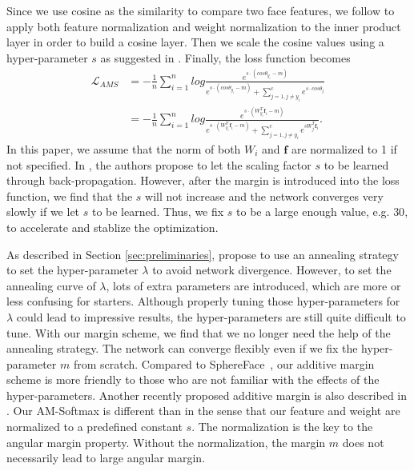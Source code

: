 \documentclass[10pt,twocolumn,letterpaper]{article}
\begin{document}
Since we use cosine as the similarity to compare two face features, we follow \cite{wang2017normface,liu2017spherenet,liu_2017_coco_v2} to apply both feature normalization and weight normalization to the inner product layer in order to build a cosine layer. Then we scale the cosine values using a hyper-parameter $s$ as suggested in \cite{wang2017normface,liu2017spherenet,liu_2017_coco_v2}. Finally, the loss function becomes
\begin{equation}
\begin{aligned}
\mathcal{L}_{AMS} & = -\frac{1}{n}\sum_{i=1}^n{log\frac{e^{s \cdot  \left(cos\theta_{y_i} - m \right)}}{e^{s \cdot \left(cos\theta_{y_i} - m \right)} + \sum_{j=1,j\neq y_i}^{c}{e^{s \cdot  cos\theta_{j}}}}}\\
& = -\frac{1}{n}\sum_{i=1}^n{log\frac{e^{s \cdot  \left(W_{y_i}^T \bm{f}_i - m \right)}}{e^{s \cdot  \left(W_{y_i}^T \bm{f}_i - m \right)} + \sum_{j=1,j\neq y_i}^c{e^{s W_j^T \bm{f}_i}}}}.
\end{aligned}
\label{eq:am-softmax}
\end{equation}
In this paper, we assume that the norm of both $W_i$ and $\bm{f}$ are normalized to 1 if not specified. In \cite{wang2017normface}, the authors propose to let the scaling factor $s$ to be learned through back-propagation. However, after the margin is introduced into the loss function, we find that the $s$ will not increase and the network converges very slowly if we let $s$ to be learned. Thus, we fix $s$ to be a large enough value, e.g. $30$, to accelerate and stablize the optimization. 



As described in Section \ref{sec:preliminaries}, \cite{liu2016large,liu2017sphereface} propose to use an annealing strategy to set the hyper-parameter $\lambda$ to avoid network divergence. However, to set the annealing curve of $\lambda$, lots of extra parameters are introduced, which are more or less confusing for starters. Although properly tuning those hyper-parameters for $\lambda$ could lead to impressive results, the hyper-parameters are still quite difficult to tune. With our margin scheme, we find that we no longer need the help of the annealing strategy. The network can converge flexibly even if we fix the hyper-parameter $m$ from scratch. Compared to SphereFace~\cite{liu2017sphereface}, our additive margin scheme is more friendly to those who are not familiar with the effects of the hyper-parameters. Another recently proposed additive margin is also described in \cite{liang2017soft}. Our AM-Softmax is different than \cite{liang2017soft} in the sense that our feature and weight are normalized to a predefined constant $s$. The normalization is the key to the angular margin property. Without the normalization, the margin $m$ does not necessarily lead to large angular margin.
\end{document}
